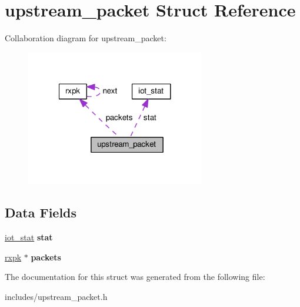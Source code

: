 \hypertarget{structupstream__packet}{\section{upstream\-\_\-packet Struct Reference}
\label{structupstream__packet}
}


Collaboration diagram for upstream\-\_\-packet\-:\nopagebreak
\begin{figure}[H]
\begin{center}
\leavevmode
\includegraphics[width=221pt]{structupstream__packet__coll__graph}
\end{center}
\end{figure}
\subsection*{Data Fields}
\begin{DoxyCompactItemize}
\item 
\hypertarget{structupstream__packet_abe86b4951b6df6fbb6d7bbf7d014f125}{\hyperlink{structiot__stat}{iot\-\_\-stat} {\bfseries stat}}\label{structupstream__packet_abe86b4951b6df6fbb6d7bbf7d014f125}

\item 
\hypertarget{structupstream__packet_a4ed16bb642cf466d4d284c9f46bc0805}{\hyperlink{structrxpk}{rxpk} $\ast$ {\bfseries packets}}\label{structupstream__packet_a4ed16bb642cf466d4d284c9f46bc0805}

\end{DoxyCompactItemize}


The documentation for this struct was generated from the following file\-:\begin{DoxyCompactItemize}
\item 
includes/upstream\-\_\-packet.\-h\end{DoxyCompactItemize}
